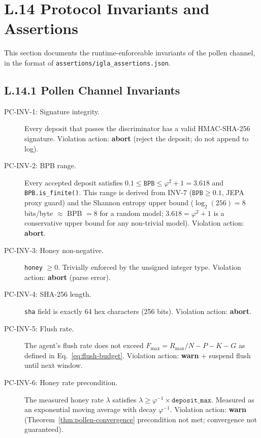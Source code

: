 \section*{L.14 \quad Protocol Invariants and Assertions}
\label{sec:appl-invariants}

This section documents the runtime-enforceable invariants of the
pollen channel, in the format of
\texttt{assertions/igla\_assertions.json}.

\subsection*{L.14.1 \quad Pollen Channel Invariants}

\begin{description}
\item[PC-INV-1: Signature integrity.]
  Every deposit that passes the discriminator has a valid HMAC-SHA-256
  signature.  Violation action: \textbf{abort} (reject the deposit;
  do not append to log).

\item[PC-INV-2: BPB range.]
  Every accepted deposit satisfies $0.1 \leq \texttt{BPB} \leq
  \varphi^{2} + 1 = 3.618$ and \texttt{BPB.is\_finite()}.
  This range is derived from INV-7 ($\texttt{BPB} \geq 0.1$, JEPA
  proxy guard) and the Shannon entropy upper bound
  ($\log_{2}(256) = 8$ bits/byte $\approx$ BPB $= 8$ for a random
  model; $3.618 = \varphi^{2} + 1$ is a conservative upper bound for
  any non-trivial model).  Violation action: \textbf{abort}.

\item[PC-INV-3: Honey non-negative.]
  \texttt{honey} $\geq 0$.  Trivially enforced by the unsigned integer
  type.  Violation action: \textbf{abort} (parse error).

\item[PC-INV-4: SHA-256 length.]
  \texttt{sha} field is exactly 64 hex characters (256 bits).
  Violation action: \textbf{abort}.

\item[PC-INV-5: Flush rate.]
  The agent's flush rate does not exceed
  $F_{\max} = R_{\max}/N - P - K - G$ as defined in
  Eq.~\eqref{eq:flush-budget}.  Violation action: \textbf{warn} +
  suspend flush until next window.

\item[PC-INV-6: Honey rate precondition.]
  The measured honey rate $\lambda$ satisfies
  $\lambda \geq \varphi^{-1} \times \texttt{deposit\_max}$.
  Measured as an exponential moving average with decay $\varphi^{-1}$.
  Violation action: \textbf{warn} (Theorem~\ref{thm:pollen-convergence}
  precondition not met; convergence not guaranteed).
\end{description}

